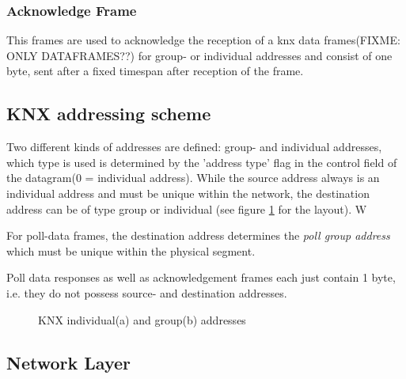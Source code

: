 \subsubsection{Acknowledge Frame}

This frames are used to acknowledge the reception of a knx data frames(FIXME: ONLY DATAFRAMES??) for group- or individual addresses and consist
of one byte, sent after a fixed timespan after reception of the frame.

\subsection{KNX addressing scheme}

Two different kinds of addresses are defined: group- and individual addresses, which type is used is determined by the 'address type' flag in the
control field of the datagram(0 = individual address). While the source address always is an individual address and must be unique
within the network, the destination address can be of type group or individual (see figure \ref{fig:knxAddr} for the layout). W

For poll-data frames, the destination address determines the \textit{poll group address} which must be unique within the physical segment.

Poll data responses as well as acknowledgement frames each just contain 1 byte, i.e. they do not possess source- and destination addresses.

\begin{figure}
 \centering
 \caption{KNX individual(a) and group(b) addresses} 
\label{fig:knxAddr}
\end{figure}


\subsection{Network Layer}

